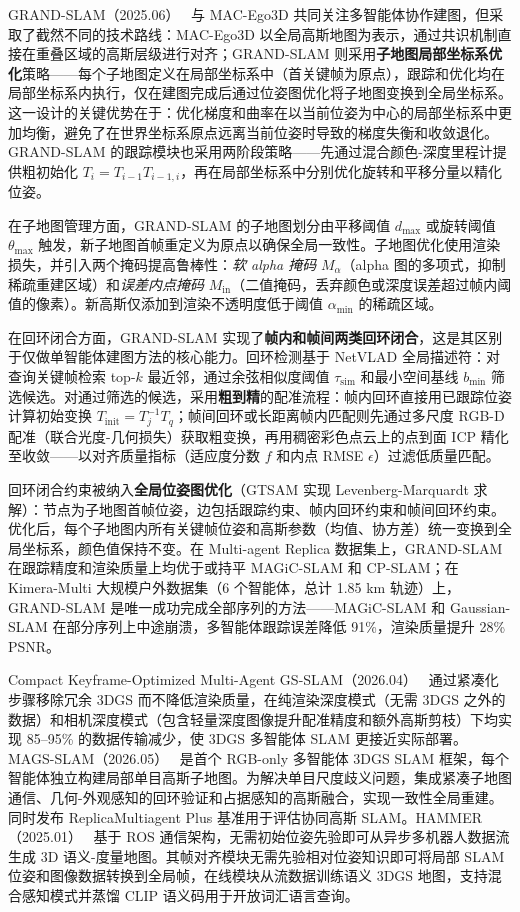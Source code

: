 GRAND-SLAM（2025.06）~\cite{2506_18885} 与 MAC-Ego3D 共同关注多智能体协作建图，但采取了截然不同的技术路线：MAC-Ego3D 以全局高斯地图为表示，通过共识机制直接在重叠区域的高斯层级进行对齐；GRAND-SLAM 则采用\textbf{子地图局部坐标系优化}策略——每个子地图定义在局部坐标系中（首关键帧为原点），跟踪和优化均在局部坐标系内执行，仅在建图完成后通过位姿图优化将子地图变换到全局坐标系。这一设计的关键优势在于：优化梯度和曲率在以当前位姿为中心的局部坐标系中更加均衡，避免了在世界坐标系原点远离当前位姿时导致的梯度失衡和收敛退化。GRAND-SLAM 的跟踪模块也采用两阶段策略——先通过混合颜色-深度里程计提供粗初始化 $T_i = T_{i-1} T_{i-1,i}$，再在局部坐标系中分别优化旋转和平移分量以精化位姿。

在子地图管理方面，GRAND-SLAM 的子地图划分由平移阈值 $d_{\max}$ 或旋转阈值 $\theta_{\max}$ 触发，新子地图首帧重定义为原点以确保全局一致性。子地图优化使用渲染损失，并引入两个掩码提高鲁棒性：\textit{软 alpha 掩码} $M_\alpha$（alpha 图的多项式，抑制稀疏重建区域）和\textit{误差内点掩码} $M_{\mathrm{in}}$（二值掩码，丢弃颜色或深度误差超过帧内阈值的像素）。新高斯仅添加到渲染不透明度低于阈值 $\alpha_{\min}$ 的稀疏区域。

在回环闭合方面，GRAND-SLAM 实现了\textbf{帧内和帧间两类回环闭合}，这是其区别于仅做单智能体建图方法的核心能力。回环检测基于 NetVLAD 全局描述符：对查询关键帧检索 top-$k$ 最近邻，通过余弦相似度阈值 $\tau_{\mathrm{sim}}$ 和最小空间基线 $b_{\min}$ 筛选候选。对通过筛选的候选，采用\textbf{粗到精}的配准流程：帧内回环直接用已跟踪位姿计算初始变换 $T_{\mathrm{init}} = T_j^{-1} T_q$；帧间回环或长距离帧内匹配则先通过多尺度 RGB-D 配准（联合光度-几何损失）获取粗变换，再用稠密彩色点云上的点到面 ICP 精化至收敛——以对齐质量指标（适应度分数 $f$ 和内点 RMSE $\epsilon$）过滤低质量匹配。

回环闭合约束被纳入\textbf{全局位姿图优化}（GTSAM 实现 Levenberg-Marquardt 求解）：节点为子地图首帧位姿，边包括跟踪约束、帧内回环约束和帧间回环约束。优化后，每个子地图内所有关键帧位姿和高斯参数（均值、协方差）统一变换到全局坐标系，颜色值保持不变。在 Multi-agent Replica 数据集上，GRAND-SLAM 在跟踪精度和渲染质量上均优于或持平 MAGiC-SLAM 和 CP-SLAM；在 Kimera-Multi 大规模户外数据集（6 个智能体，总计 1.85 km 轨迹）上，GRAND-SLAM 是唯一成功完成全部序列的方法——MAGiC-SLAM 和 Gaussian-SLAM 在部分序列上中途崩溃，多智能体跟踪误差降低 91\%，渲染质量提升 28\% PSNR。

Compact Keyframe-Optimized Multi-Agent GS-SLAM（2026.04）~\cite{2604_00804} 通过紧凑化步骤移除冗余 3DGS 而不降低渲染质量，在纯渲染深度模式（无需 3DGS 之外的数据）和相机深度模式（包含轻量深度图像提升配准精度和额外高斯剪枝）下均实现 85--95\% 的数据传输减少，使 3DGS 多智能体 SLAM 更接近实际部署。MAGS-SLAM（2026.05）~\cite{2605_10760} 是首个 RGB-only 多智能体 3DGS SLAM 框架，每个智能体独立构建局部单目高斯子地图。为解决单目尺度歧义问题，集成紧凑子地图通信、几何-外观感知的回环验证和占据感知的高斯融合，实现一致性全局重建。同时发布 ReplicaMultiagent Plus 基准用于评估协同高斯 SLAM。HAMMER（2025.01）~\cite{2501_14147} 基于 ROS 通信架构，无需初始位姿先验即可从异步多机器人数据流生成 3D 语义-度量地图。其帧对齐模块无需先验相对位姿知识即可将局部 SLAM 位姿和图像数据转换到全局帧，在线模块从流数据训练语义 3DGS 地图，支持混合感知模式并蒸馏 CLIP 语义码用于开放词汇语言查询。

